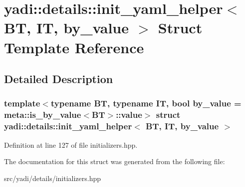\hypertarget{structyadi_1_1details_1_1init__yaml__helper}{}\section{yadi\+:\+:details\+:\+:init\+\_\+yaml\+\_\+helper$<$ BT, IT, by\+\_\+value $>$ Struct Template Reference}
\label{structyadi_1_1details_1_1init__yaml__helper}


\subsection{Detailed Description}
\subsubsection*{template$<$typename BT, typename IT, bool by\+\_\+value = meta\+::is\+\_\+by\+\_\+value$<$\+B\+T$>$\+::value$>$\newline
struct yadi\+::details\+::init\+\_\+yaml\+\_\+helper$<$ B\+T, I\+T, by\+\_\+value $>$}



Definition at line 127 of file initializers.\+hpp.



The documentation for this struct was generated from the following file\+:\begin{DoxyCompactItemize}
\item 
src/yadi/details/initializers.\+hpp\end{DoxyCompactItemize}
